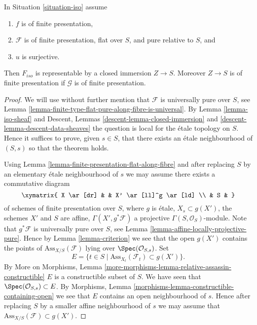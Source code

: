\begin{theorem}
\label{theorem-flattening-map}
In
Situation \ref{situation-iso}
assume
\begin{enumerate}
\item $f$ is of finite presentation,
\item $\mathcal{F}$ is of finite presentation, flat over $S$, and
pure relative to $S$, and
\item $u$ is surjective.
\end{enumerate}
Then $F_{iso}$ is representable by a closed immersion $Z \to S$.
Moreover $Z \to S$ is of finite presentation if $\mathcal{G}$ is
of finite presentation.
\end{theorem}

\begin{proof}
We will use without further mention that $\mathcal{F}$ is universally pure
over $S$, see
Lemma \ref{lemma-finite-type-flat-pure-along-fibre-is-universal}.
By
Lemma \ref{lemma-iso-sheaf}
and
Descent, Lemmas \ref{descent-lemma-closed-immersion} and
\ref{descent-lemma-descent-data-sheaves}
the question is local for the \'etale topology on $S$.
Hence it suffices to prove, given $s \in S$, that there exists
an \'etale neighbourhood of $(S, s)$ so that the theorem holds.

\medskip\noindent
Using
Lemma \ref{lemma-finite-presentation-flat-along-fibre}
and after replacing $S$ by an elementary \'etale neighbourhood of $s$
we may assume there exists a commutative diagram
$$
\xymatrix{
X \ar[dr] & & X' \ar[ll]^g \ar[ld] \\
& S &
}
$$
of schemes of finite presentation over $S$,
where $g$ is \'etale, $X_s \subset g(X')$, the schemes $X'$ and $S$ are affine,
$\Gamma(X', g^*\mathcal{F})$ a projective $\Gamma(S, \mathcal{O}_S)$-module.
Note that $g^*\mathcal{F}$ is universally pure over $S$, see
Lemma \ref{lemma-affine-locally-projective-pure}.
Hence by
Lemma \ref{lemma-criterion}
we see that the open $g(X')$ contains the points of
$\text{Ass}_{X/S}(\mathcal{F})$ lying over $\Spec(\mathcal{O}_{S, s})$.
Set
$$
E = \{t \in S \mid \text{Ass}_{X_t}(\mathcal{F}_t) \subset g(X') \}.
$$
By
More on Morphisms,
Lemma \ref{more-morphisms-lemma-relative-assassin-constructible}
$E$ is a constructible subset of $S$. We have seen that
$\Spec(\mathcal{O}_{S, s}) \subset E$. By
Morphisms, Lemma \ref{morphisms-lemma-constructible-containing-open}
we see that $E$ contains an open neighbourhood of $s$. Hence after
replacing $S$ by a smaller affine neighbourhood of $s$ we may assume that
$\text{Ass}_{X/S}(\mathcal{F}) \subset g(X')$.


\end{proof}
